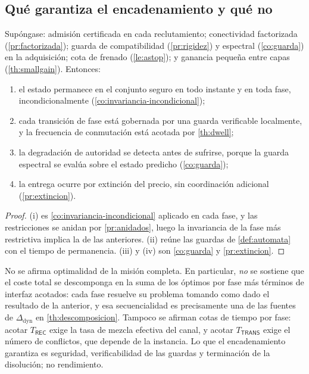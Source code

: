\subsection{Qué garantiza el encadenamiento y qué no}

\begin{teorema}
\label{th:mision}
Supóngase: admisión certificada en cada reclutamiento; conectividad factorizada
(\cref{pr:factorizada}); guarda de compatibilidad (\cref{pr:rigidez}) y
espectral (\cref{co:guarda}) en la adquisición; cota de frenado
(\cref{le:astop}); y ganancia pequeña entre capas (\cref{th:smallgain}).
Entonces:
\begin{enumerate}[label=(\roman*),leftmargin=2.2em,topsep=0.2em,itemsep=0.15em]
  \item el estado permanece en el conjunto seguro en todo instante y en toda
  fase, incondicionalmente (\cref{co:invariancia-incondicional});
  \item cada transición de fase está gobernada por una guarda verificable
  localmente, y la frecuencia de conmutación está acotada por
  \cref{th:dwell};
  \item la degradación de autoridad se detecta antes de sufrirse, porque la
  guarda espectral se evalúa sobre el estado predicho (\cref{co:guarda});
  \item la entrega ocurre por extinción del precio, sin coordinación adicional
  (\cref{pr:extincion}).
\end{enumerate}
\end{teorema}

\begin{proof}
(i) es \cref{co:invariancia-incondicional} aplicado en cada fase, y las
restricciones se anidan por \cref{pr:anidados}, luego la invariancia de la fase
más restrictiva implica la de las anteriores. (ii) reúne las guardas de
\cref{def:automata} con el tiempo de permanencia. (iii) y (iv) son
\cref{co:guarda} y \cref{pr:extincion}.
\end{proof}

\begin{observacion}
\label{obs:mision-limites}
No se afirma optimalidad de la misión completa. En particular, \emph{no} se
sostiene que el coste total se descomponga en la suma de los óptimos por fase
más términos de interfaz acotados: cada fase resuelve su problema tomando como
dado el resultado de la anterior, y esa secuencialidad es precisamente una de
las fuentes de $\Delta_{\mathrm{dyn}}$ en \cref{th:descomposicion}. Tampoco se
afirman cotas de tiempo por fase: acotar $T_{\textsf{REC}}$ exige la tasa de
mezcla efectiva del canal, y acotar $T_{\textsf{TRANS}}$ exige el número de
conflictos, que depende de la instancia. Lo que el encadenamiento garantiza es
seguridad, verificabilidad de las guardas y terminación de la disolución; no
rendimiento.
\end{observacion}
